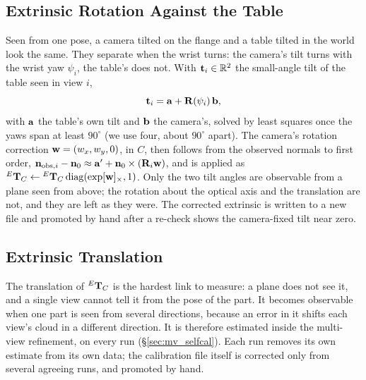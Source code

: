 \subsection{Extrinsic Rotation Against the Table}
\label{sec:cal_rot}
Seen from one pose, a camera tilted on the flange and a table tilted in the world look the same.
They separate when the wrist turns: the camera's tilt turns with the wrist yaw $\psi_i$, the
table's does not. With $\mathbf{t}_i\in\mathbb{R}^2$ the small-angle tilt of the table seen in view
$i$,
\begin{equation}
\mathbf{t}_i=\mathbf{a}+\mathbf{R}(\psi_i)\,\mathbf{b},
\label{eq:tilt_split}
\end{equation}
with $\mathbf{a}$ the table's own tilt and $\mathbf{b}$ the camera's, solved by least squares once the
yaws span at least $90^\circ$ (we use four, about $90^\circ$ apart). The camera's rotation
correction $\mathbf{w}=(w_x,w_y,0)$, in $C$, then follows from the observed normals to first order,
$\mathbf{n}_{\mathrm{obs},i}-\mathbf{n}_0\approx\mathbf{a}'+\mathbf{n}_0\times(\mathbf{R}_i\mathbf{w})$, and is
applied as ${}^{E}\mathbf{T}_{C}\leftarrow{}^{E}\mathbf{T}_{C}\operatorname{diag}(\exp[\mathbf{w}]_\times,1)$. Only the two
tilt angles are observable from a plane seen from above; the rotation about the optical axis and
the translation are not, and they are left as they were. The corrected extrinsic is written to a
new file and promoted by hand after a re-check shows the camera-fixed tilt near zero.

\subsection{Extrinsic Translation}
\label{sec:cal_trans}
The translation of ${}^{E}\mathbf{T}_{C}$ is the hardest link to measure: a plane does not see it, and a
single view cannot tell it from the pose of the part. It becomes observable when one part is seen
from several directions, because an error in it shifts each view's cloud in a different
direction. It is therefore estimated inside the multi-view refinement, on every run
(\S\ref{sec:mv_selfcal}). Each run removes its own estimate from its own data; the calibration
file itself is corrected only from several agreeing runs, and promoted by hand.

